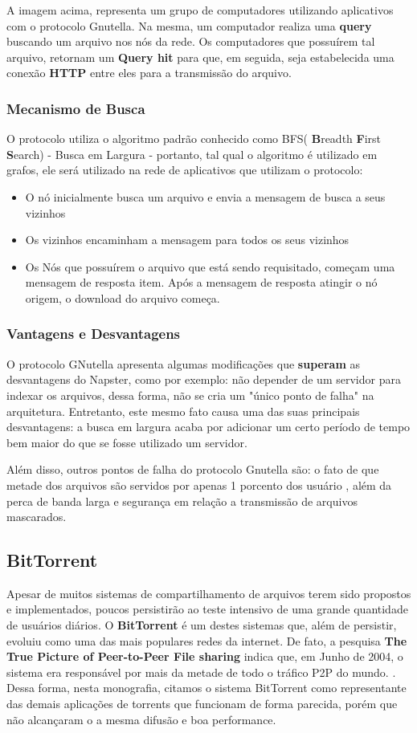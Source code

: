 \documentclass[a4paper]{article}
\begin{document}
A imagem acima, representa um grupo de computadores utilizando aplicativos com o protocolo Gnutella. Na mesma, um computador realiza uma \textbf{query} buscando um arquivo nos nós da rede. Os computadores que possuírem tal arquivo, retornam um \textbf{Query hit} para que, em seguida, seja estabelecida uma conexão \textbf{HTTP} entre eles para a transmissão do arquivo. 

\subsubsection{Mecanismo de Busca}
O protocolo utiliza o algoritmo padrão conhecido como BFS( \textbf{B}readth \textbf{F}irst \textbf{S}earch) - Busca em Largura - portanto, tal qual o algoritmo é utilizado em grafos, ele será utilizado na rede de aplicativos que utilizam o protocolo:\cite{gayatriGN}
\begin{itemize}
	\item O nó inicialmente busca um arquivo e envia a mensagem de busca a seus vizinhos
	\item Os vizinhos encaminham a mensagem para todos os seus vizinhos
	\item Os Nós que possuírem o arquivo que está sendo requisitado, começam uma mensagem de resposta
	item. Após a mensagem de resposta atingir o nó origem, o download do arquivo começa.
\end{itemize}

\subsubsection{Vantagens e Desvantagens}
O protocolo GNutella apresenta algumas modificações que \textbf{superam} as desvantagens do Napster, como por exemplo: não depender de um servidor para indexar os arquivos, dessa forma, não se cria um "único ponto de falha" na arquitetura. Entretanto, este mesmo fato causa uma das suas principais desvantagens: a busca em largura acaba por adicionar um certo período de tempo bem maior do que se fosse utilizado um servidor.

Além disso, outros pontos de falha do protocolo Gnutella são: o fato de que metade dos arquivos são servidos por apenas 1 porcento dos usuário , além da perca de banda larga e segurança em relação a transmissão de arquivos mascarados.\cite{gayatriGN}

\subsection{BitTorrent}
Apesar de muitos sistemas de compartilhamento de arquivos terem sido propostos e implementados, poucos persistirão ao teste intensivo de uma grande quantidade de usuários diários. O \textbf{BitTorrent} é um destes sistemas que, além de persistir, evoluiu como uma das mais populares redes da internet. De fato, a pesquisa \textbf{The True Picture of Peer-to-Peer File sharing} indica que, em Junho de 2004, o sistema era responsável por mais da metade de todo o tráfico P2P do mundo. \cite{pouwelsebit}. Dessa forma, nesta monografia, citamos o sistema BitTorrent como representante das demais aplicações de torrents que funcionam de forma parecida, porém que não alcançaram o a mesma difusão e boa performance.
\end{document}
